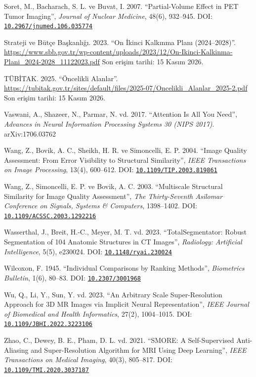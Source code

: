 \documentclass[11pt,a4paper]{article}
\newcommand{\doi}[1]{DOI: \href{https://doi.org/#1}{\nolinkurl{#1}}}
\begin{document}
\begin{list}{}{\setlength{\leftmargin}{1.5em}\setlength{\itemindent}{-1.5em}%
  \setlength{\itemsep}{0.25\baselineskip}\setlength{\parsep}{0pt}}
\item Soret, M., Bacharach, S. L. ve Buvat, I. 2007. ``Partial-Volume Effect in PET Tumor
Imaging'', \emph{Journal of Nuclear Medicine}, 48(6), 932--945. \doi{10.2967/jnumed.106.035774}

\item Strateji ve Bütçe Başkanlığı. 2023. ``On İkinci Kalkınma Planı (2024--2028)''.
\url{https://www.sbb.gov.tr/wp-content/uploads/2023/12/On-Ikinci-Kalkinma-Plani_2024-2028_11122023.pdf}
Son erişim tarihi: 15 Kasım 2026.

\item TÜBİTAK. 2025. ``Öncelikli Alanlar''.
\url{https://tubitak.gov.tr/sites/default/files/2025-07/Oncelikli_Alanlar_2025-2.pdf}
Son erişim tarihi: 15 Kasım 2026.

\item Vaswani, A., Shazeer, N., Parmar, N. vd. 2017. ``Attention Is All You Need'', \emph{Advances
in Neural Information Processing Systems 30 (NIPS 2017)}. arXiv:1706.03762

\item Wang, Z., Bovik, A. C., Sheikh, H. R. ve Simoncelli, E. P. 2004. ``Image Quality Assessment:
From Error Visibility to Structural Similarity'', \emph{IEEE Transactions on Image Processing},
13(4), 600--612. \doi{10.1109/TIP.2003.819861}

\item Wang, Z., Simoncelli, E. P. ve Bovik, A. C. 2003. ``Multiscale Structural Similarity for
Image Quality Assessment'', \emph{The Thirty-Seventh Asilomar Conference on Signals, Systems \&
Computers}, 1398--1402. \doi{10.1109/ACSSC.2003.1292216}

\item Wasserthal, J., Breit, H.-C., Meyer, M. T. vd. 2023. ``TotalSegmentator: Robust
Segmentation of 104 Anatomic Structures in CT Images'', \emph{Radiology: Artificial
Intelligence}, 5(5), e230024. \doi{10.1148/ryai.230024}

\item Wilcoxon, F. 1945. ``Individual Comparisons by Ranking Methods'', \emph{Biometrics
Bulletin}, 1(6), 80--83. \doi{10.2307/3001968}

\item Wu, Q., Li, Y., Sun, Y. vd. 2023. ``An Arbitrary Scale Super-Resolution Approach for 3D MR
Images via Implicit Neural Representation'', \emph{IEEE Journal of Biomedical and Health
Informatics}, 27(2), 1004--1015. \doi{10.1109/JBHI.2022.3223106}

\item Zhao, C., Dewey, B. E., Pham, D. L. vd. 2021. ``SMORE: A Self-Supervised Anti-Aliasing and
Super-Resolution Algorithm for MRI Using Deep Learning'', \emph{IEEE Transactions on Medical
Imaging}, 40(3), 805--817. \doi{10.1109/TMI.2020.3037187}


\end{list}
\end{document}
